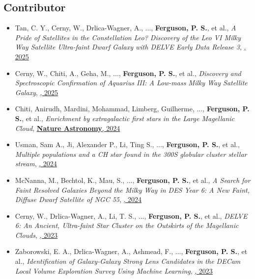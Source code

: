 \subsection{Contributor}
\begin{itemize}[itemsep=1pt]
    \item {Tan}, C. Y., {Cerny}, W., {Drlica-Wagner}, A., ..., \textbf{Ferguson, P. S.}, et al., \textit{{A Pride of Satellites in the Constellation Leo? Discovery of the Leo VI Milky Way Satellite Ultra-faint Dwarf Galaxy with DELVE Early Data Release 3}}, \href{https://ui.adsabs.harvard.edu/abs/2025ApJ...979..176T}{\textbf{\apj}, 2025}
    \item {Cerny}, W., {Chiti}, A., {Geha}, M., ..., \textbf{Ferguson, P. S.}, et al., \textit{{Discovery and Spectroscopic Confirmation of Aquarius III: A Low-mass Milky Way Satellite Galaxy}}, \href{https://ui.adsabs.harvard.edu/abs/2025ApJ...979..164C}{\textbf{\apj}, 2025}
    \item {Chiti}, Anirudh, {Mardini}, Mohammad, {Limberg}, Guilherme, ..., \textbf{Ferguson, P. S.}, et al., \textit{{Enrichment by extragalactic first stars in the Large Magellanic Cloud}}, \href{https://ui.adsabs.harvard.edu/abs/2024NatAs...8..637C}{\textbf{Nature Astronomy}, 2024}
    \item {Usman}, Sam A., {Ji}, Alexander P., {Li}, Ting S., ..., \textbf{Ferguson, P. S.}, et al., \textit{{Multiple populations and a CH star found in the 300S globular cluster stellar stream}}, \href{https://ui.adsabs.harvard.edu/abs/2024MNRAS.529.2413U}{\textbf{\mnras}, 2024}
    \item {McNanna}, M., {Bechtol}, K., {Mau}, S., ..., \textbf{Ferguson, P. S.}, et al., \textit{{A Search for Faint Resolved Galaxies Beyond the Milky Way in DES Year 6: A New Faint, Diffuse Dwarf Satellite of NGC 55}}, \href{https://ui.adsabs.harvard.edu/abs/2024ApJ...961..126M}{\textbf{\apj}, 2024}
    \item {Cerny}, W., {Drlica-Wagner}, A., {Li}, T. S., ..., \textbf{Ferguson, P. S.}, et al., \textit{{DELVE 6: An Ancient, Ultra-faint Star Cluster on the Outskirts of the Magellanic Clouds}}, \href{https://ui.adsabs.harvard.edu/abs/2023ApJ...953L..21C}{\textbf{\apjl}, 2023}
    \item {Zaborowski}, E. A., {Drlica-Wagner}, A., {Ashmead}, F., ..., \textbf{Ferguson, P. S.}, et al., \textit{{Identification of Galaxy-Galaxy Strong Lens Candidates in the DECam Local Volume Exploration Survey Using Machine Learning}}, \href{https://ui.adsabs.harvard.edu/abs/2023ApJ...954...68Z}{\textbf{\apj}, 2023}

\end{itemize}
